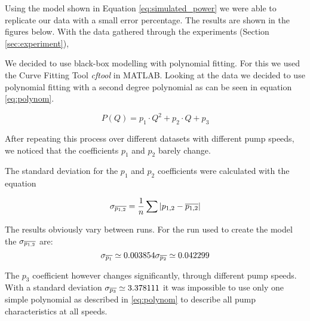 Using the model shown in Equation \ref{eq:simulated_power} we were able to replicate our data with a small error percentage. The results
are shown in the figures below.
\newpage
With the data gathered through the experiments (Section \ref{sec:experiment}),

We decided to use black-box modelling with polynomial fitting.
For this we used the Curve Fitting Tool \cite{cftool} \textit{cftool} 
 in MATLAB.
Looking at the data we decided to use polynomial fitting with a second degree polynomial
as can be seen in equation \ref{eq:polynom}.

\begin{equation}
	 P(Q) = p_1 \cdot Q^2 + p_2 \cdot Q + p_3
	 \label{eq:polynom}
\end{equation}

After repeating this process over different datasets with different pump speeds,
we noticed that the coefficients $p_1$ and $p_2$ barely change.

The standard deviation for the $p_1$ and $p_2$ coefficients were calculated with the equation 

\begin{equation}
	\sigma_{\overline{p_{1,2}}} = \dfrac{1}{n}\sum |p_{1,2}-\overline{p_{1,2}}|
	\label{eq:avedev}
\end{equation}

The results obviously vary between runs. For the run used to create the model the $\sigma_{\overline{p_{1,2}}}$ are:
\begin{equation}
	\sigma_{\mean{p_1}} \simeq 0.003854$$
	
	$$\sigma_{\mean{p_2}} \simeq 0.042299
\end{equation}

The $p_3$ coefficient however changes significantly, through different pump speeds.
With a standard deviation $\sigma_{\overline{p_3}} \simeq 3.378111$ it was impossible to use only one simple polynomial as described in 
\ref{eq:polynom} to describe all pump characteristics at all speeds.

